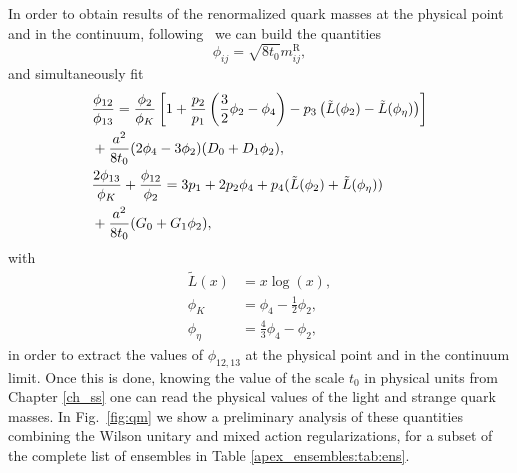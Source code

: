 In order to obtain results of the renormalized quark masses at the physical point and in the continuum, following~\citep{qm} we can build the quantities
\begin{equation}
\label{eq:phiij}
\phi_{ij}=\sqrt{8t_0}m_{ij}^{\textrm{R}},
\end{equation}
and simultaneously fit
\begin{align}
&\frac{\phi_{12}}{\phi_{13}}=\frac{\phi_2}{\phi_K}\left[1+\frac{p_2}{p_1}\left(\frac{3}{2}\phi_2-\phi_4\right)-p_3\left(\tilde{L}(\phi_2)-\tilde{L}(\phi_{\eta})\right)\right] \notag \\
&+\frac{a^2}{8t_0}(2\phi_4-3\phi_2)(D_0+D_1\phi_2),\\
&\frac{2\phi_{13}}{\phi_K}+\frac{\phi_{12}}{\phi_2}=3p_1+2p_2\phi_4+p_4(\tilde{L}(\phi_2)+\tilde{L}(\phi_{\eta})) \notag \\
&+\frac{a^2}{8t_0}(G_0+G_1\phi_2),
\end{align}
with
\begin{align}
\tilde{L}(x)&=x\log(x),\\
\phi_K&=\phi_4-\frac{1}{2}\phi_2,\\
\phi_{\eta}&=\frac{4}{3}\phi_4-\phi_2,
\end{align}
in order to extract the values of $\phi_{12,13}$ at the physical point and in the continuum limit. Once this is done, knowing the value of the scale $t_0$ in physical units from Chapter \ref{ch_ss} one can read the physical values of the light and strange quark masses. In Fig.~\ref{fig:qm} we show a preliminary analysis of these quantities combining the Wilson unitary and mixed action regularizations, for a subset of the complete list of ensembles in Table \ref{apex_ensembles:tab:ens}.

